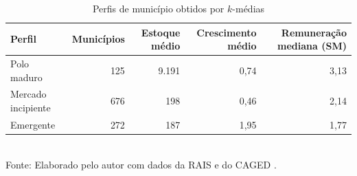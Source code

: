 \begin{table}[htbp]
    \centering
    \caption{Perfis de município obtidos por $k$-médias}
    \label{tab:clusters}
    \footnotesize
    \renewcommand{\arraystretch}{1.25}
    \begin{tabular}{lrrrr}
        \toprule
        \rowcolor{black!8}
        \textbf{Perfil} & \textbf{Municípios} & \textbf{Estoque médio} & \textbf{Crescimento médio} & \textbf{Remuneração mediana (SM)} \\
        \midrule
        Polo maduro & 125 & 9.191 & 0,74 & 3,13 \\
        Mercado incipiente & 676 & 198 & 0,46 & 2,14 \\
        Emergente & 272 & 187 & 1,95 & 1,77 \\
        \bottomrule
    \end{tabular}
    \\[4pt]
    Fonte: Elaborado pelo autor com dados da RAIS e do CAGED \cite{RAIS2024, CAGED2024}.
\end{table}
